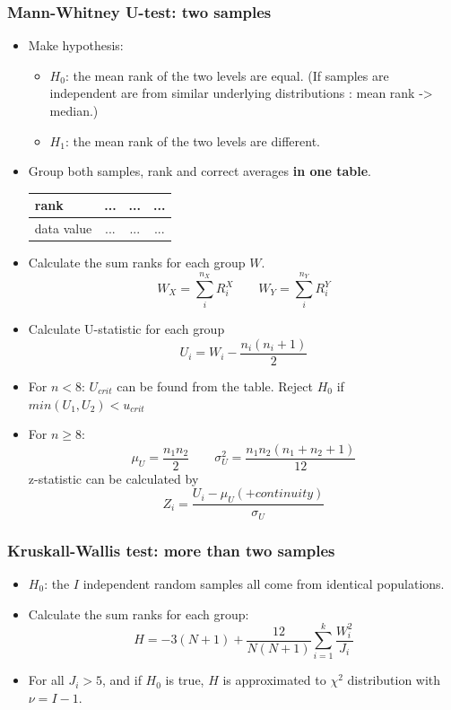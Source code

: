 \documentclass{article}
\begin{document}
\subsubsection{Mann-Whitney U-test: \footnotesize{two samples}}
\begin{itemize}
        \item Make hypothesis: 
        \begin{itemize}
            \item $H_{0}$: the mean rank of the two levels are equal. (If samples are independent are from similar underlying distributions : mean rank -> median.)
            \item $H_{1}$: the mean rank of the two levels are different.
        \end{itemize}
        \item Group both samples, rank and correct averages \textbf{in one table}.
         \begin{table}[H]
            \centering
            \begin{tabular}{l|c|c|c}
            rank  &  ...  &  ...&  ...\\ \hline
            data value & ...  &  ...&  ...\\ 
            \end{tabular}
        \end{table}
        \item Calculate the sum ranks for each group $W$.
        \[W_{X}=\sum_{i}^{n_{X}}R_{i}^{X} \quad \quad W_{Y}=\sum_{i}^{n_{Y}}R_{i}^{Y}\]
        \item Calculate U-statistic for each group
        \[U_{i} = W_{i}-\frac{n_{i}(n_{i}+1)}{2}\]
        \item For $n<8$: $U_{crit}$ can be found from the table. Reject $H_{0}$ if $min(U_{1}, U_{2})<u_{crit}$
        \item For $n\geq 8$: \[\mu_{U}=\frac{n_{1}n_{2}}{2} \quad \quad \sigma_{U}^{2}= \frac{n_{1}n_{2}(n_{1}+n_{2}+1)}{12}\]
        z-statistic can be calculated by \[Z_{i}=\frac{U_{i}-\mu_{U}(+continuity)}{\sigma_{U}}\]
    \end{itemize}
\subsubsection{Kruskall-Wallis test: \footnotesize{more than two samples}}
\begin{itemize}
        \item $H_{0}$: the $I$ independent random samples all come from identical populations.
        \item Calculate the sum ranks for each group: 
        \[H=-3(N+1)+\frac{12}{N(N+1)}\sum_{i=1}^{k}\frac{W_{i}^{2}}{J_{i}}\]
        \item For all $J_{i} > 5$, and if $H_{0}$ is true, $H$ is approximated to $\chi^{2}$ distribution with $\nu = I-1$.
\end{itemize}
\end{document}
